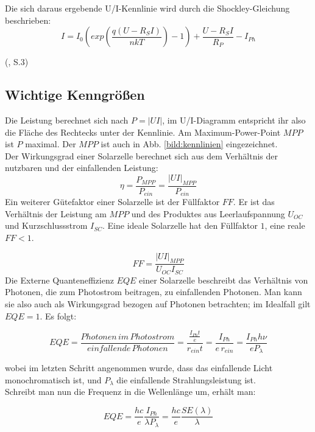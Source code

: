Die sich daraus ergebende U/I-Kennlinie wird durch die Shockley-Gleichung beschrieben:
\begin{equation}
    I = I_0 (exp(\frac{q(U-R_SI)}{nkT})-1) + \frac{U-R_SI}{R_P} - I_{Ph}
\end{equation}

(\cite{Gerken2021}, S.3)

\subsection{Wichtige Kenngrößen}
Die Leistung berechnet sich nach $P = |UI|$, im U/I-Diagramm entspricht ihr also die Fläche des Rechtecks unter der Kennlinie. Am Maximum-Power-Point $MPP$ ist $P$ maximal. Der $MPP$ ist auch in Abb. \ref{bild:kennlinien} eingezeichnet. \\
Der Wirkungsgrad einer Solarzelle berechnet sich aus dem Verhältnis der nutzbaren und der einfallenden Leistung:
\begin{equation*}
\eta = \frac{P_{MPP}}{P_{ein}} = \frac{|UI|_{MPP}}{P_{ein}}
\end{equation*}
Ein weiterer Gütefaktor einer Solarzelle ist der Füllfaktor $FF$. Er ist das Verhältnis der Leistung am $MPP$ und des Produktes aus Leerlaufspannung $U_{OC}$ und Kurzschlussstrom $I_{SC}$. Eine ideale Solarzelle hat den Füllfaktor $1$, eine reale $FF < 1$.

\begin{equation*}
FF = \frac{|UI|_{MPP}}{U_{OC} I_{SC}}
\end{equation*}
Die Externe Quanteneffizienz $EQE$ einer Solarzelle beschreibt das Verhältnis von Photonen, die zum Photostrom beitragen, zu einfallenden Photonen. Man kann sie also auch als Wirkungsgrad bezogen auf Photonen betrachten; im Idealfall gilt $EQE = 1$. Es folgt:

\begin{equation}
EQE = \frac{Photonen \, im \, Photostrom}{einfallende \, Photonen} = \frac{ \frac{I_{Ph}t}{e}}{r_{ein}t} = \frac{I_{Ph}}{e \, r_{ein}} = \frac{I_{Ph} h \nu}{e P_\lambda}
\end{equation}

wobei im letzten Schritt angenommen wurde, dass das einfallende Licht monochromatisch ist, und $P_\lambda$ die einfallende Strahlungsleistung ist. \\
Schreibt man nun die Frequenz in die Wellenlänge um, erhält man:

\begin{equation}
EQE = \frac{h c}{e} \frac{I_{Ph}}{\lambda P_\lambda} = \frac{h c}{e} \frac{SE(\lambda)}{\lambda}
\end{equation}

